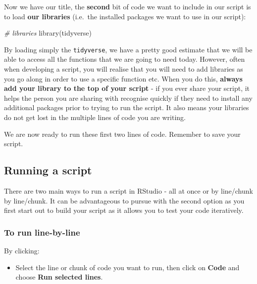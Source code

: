 \documentclass[
]{book}
\newenvironment{Shaded}{\begin{snugshade}}{\end{snugshade}}
\newcommand{\CommentTok}[1]{\textcolor[rgb]{0.56,0.35,0.01}{\textit{#1}}}
\newcommand{\FunctionTok}[1]{\textcolor[rgb]{0.00,0.00,0.00}{#1}}
\newcommand{\NormalTok}[1]{#1}
\providecommand{\tightlist}{%
  \setlength{\itemsep}{0pt}\setlength{\parskip}{0pt}}
\begin{document}
Now we have our title, the \textbf{second} bit of code we want to include in our script is to load \textbf{our libraries} (i.e.~the installed packages we want to use in our script):

\begin{Shaded}
\begin{Highlighting}[]
\CommentTok{\# libraries}
\FunctionTok{library}\NormalTok{(tidyverse)}
\end{Highlighting}
\end{Shaded}

By loading simply the \texttt{tidyverse}, we have a pretty good estimate that we will be able to access all the functions that we are going to need today. However, often when developing a script, you will realise that you will need to add libraries as you go along in order to use a specific function etc. When you do this, \textbf{always add your library to the top of your script} - if you ever share your script, it helps the person you are sharing with recognise quickly if they need to install any additional packages prior to trying to run the script. It also means your libraries do not get lost in the multiple lines of code you are writing.

We are now ready to run these first two lines of code. Remember to save your script.

\hypertarget{running-a-script}{%
\subsection{Running a script}\label{running-a-script}}

There are two main ways to run a script in RStudio - all at once or by line/chunk by line/chunk. It can be advantageous to pursue with the second option as you first start out to build your script as it allows you to test your code iteratively.

\hypertarget{to-run-line-by-line}{%
\subsubsection*{To run line-by-line}\label{to-run-line-by-line}}

By clicking:

\begin{itemize}
\tightlist
\item
  Select the line or chunk of code you want to run, then click on \textbf{Code} and choose \textbf{Run selected lines}.
\end{itemize}
\end{document}
